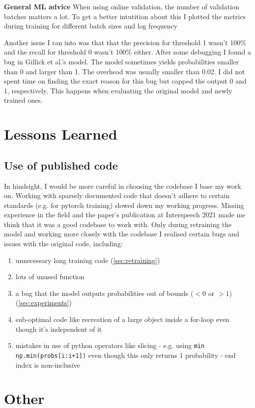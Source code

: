 \documentclass[bsc,frontabs,parskip,deptreport]{infthesis}
\begin{document}
\textbf{General ML advice}
When using online validation, the number of validation batches matters a lot. To get a better intutition about this I plotted the metrics during training for different batch sizes and log frequency


Another issue I ran into was that that the precision for threshold 1 wasn't 100\% and the recall for threshold 0 wasn't 100\% either. After some debugging I found a bug in Gillick et al.'s model. 
The model sometimes yields probabilities smaller than 0 and larger than 1. The overhead was usually smaller than 0.02. I did not spent time on finding the exact reason for this bug but capped the output 0 and 1, respectively.
This happens when evaluating the original model and newly trained ones.

\chapter{Lessons Learned}

\section{Use of published code}
In hindsight, I would be more careful in choosing the codebase I base my work on.
Working with sparsely documented code that doesn't adhere to certain standards (e.g. for pytorch training) slowed down my working progress. 
Missing experience in the field and the paper's publication at Interspeech 2021 made me think that it was a good codebase to work with.
Only during retraining the model and working more closely with the codebase I realised certain bugs and issues with the original code, including:
\begin{enumerate}
    \item unnecessary long training code (\ref{sec:retraining})
    \item lots of unused function
    \item a bug that the model outputs probabilities out of bounds ($<0$ or $>1$) (\ref{sec:experiments})
    \item sub-optimal code like recreation of a large object inside a for-loop even though it's independent of it
    \item mistakes in use of python operators like slicing - e.g. using \texttt{min} \texttt{np.min(probs[i:i+1])} even though this only returns 1 probability - end index is non-inclusive
\end{enumerate}

\chapter{Other}
\end{document}
